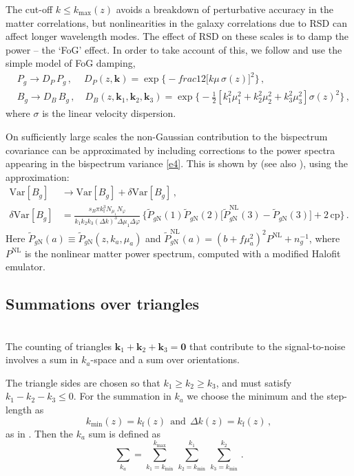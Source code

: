 The  cut-off $k\leq k_{\mathrm{max}}(z)$  avoids a breakdown of perturbative accuracy in the matter correlations, but nonlinearities in the galaxy correlations due to RSD can affect longer wavelength modes. The effect of RSD on these scales is to damp the power -- the  `FoG' effect. In order to take account of this, we follow \cite{Karagiannis:2018jdt,Yankelevich:2018uaz} and use the simple model of FoG damping,
\begin{align}
&P_g \to  D_P\, P_g\,,\quad~ D_{P}(z, \bm{k}) = \exp\Big\{-frac{1}{2}{\big[k\mu\,\sigma(z)\big]^{2}}\Big\}\,, \\
&B_g \to  D_B\, B_g\,,  \quad D_{B}(z, \bm{k}_{1},\bm{k}_{2},\bm{k}_{3}) = \exp\Big\{-\frac{1}{2}{\left[k_{1}^{2}\mu_{1}^{2}+k_{2}^{2}\mu_{2}^{2}+k_{3}^{2}\mu_{3}^{2}\right]\sigma(z)^{2}}\Big\}\,, \label{e13}
\end{align}
where $\sigma$ is the linear velocity dispersion.

On sufficiently large scales the non-Gaussian contribution to the bispectrum covariance can be  approximated by including corrections to the power spectra appearing in the bispectrum variance \eqref{e4}. This is shown by  \cite{Chan:2016ehg}  (see also \cite{Karagiannis:2018jdt}), using  the approximation:
\begin{align}
{\mathrm{Var}} [{B_{g}}] &\to  {\mathrm{Var}} [{B_{g}}]+ \delta {\mathrm{Var}} [{B_{g}}] \,, \\
\delta {\mathrm{Var}} [{B_{g}}] &= \frac{s_B\pi k_{\mathrm{f}}^3N_{\mu_1}N_\varphi}{k_1k_2k_3 (\Delta k)^3\Delta \mu_1 \Delta \varphi}\, \Big\{\tilde{P}_{g{\mathrm{N}}}(1) \tilde{P}_{g{\mathrm{N}}}(2)\Big[ \tilde{P}^{\mathrm{NL}}_{g{\mathrm{N}}}(3)-\tilde{P}_{g{\mathrm{N}}}(3)\Big] +2\, \mbox{cp}\Big\}\,.
\label{e4x}
\end{align}
Here $\tilde{P}_{g{\mathrm{N}}}(a)\equiv \tilde{P}_{g{\mathrm{N}}}(z,k_a,\mu_a)$ and $\tilde{P}^{\mathrm{NL}}_{g{\mathrm{N}}}(a) = (b+f\mu_a^2)^2P^{\mathrm{NL}}+n_g^{-1}$, where $P^{\mathrm{NL}}$ is the nonlinear matter power spectrum, computed with a modified Halofit emulator.
%
\subsection{Summations {over triangles}} 
~\\
The counting of triangles $\bm{k}_{1}+\bm{k}_{2}+\bm{k}_{3}=\bm{0}$ that contribute to the signal-to-noise  involves a sum in $k_a$-space and a sum over orientations.

The triangle sides are chosen so that $k_1\geq k_2 \geq k_3$, and must satisfy $k_1-k_2-k_3\leq 0$.
For the summation in $k_a$ we choose the minimum and  the step-length as
\begin{equation}
k_{\mathrm{min}}(z)=k_{\mathrm{f}}(z)~~\mbox{and}~~ \Delta k(z)=k_{\mathrm{f}}(z) \,,
\end{equation}
as in \cite{Karagiannis:2018jdt,Yankelevich:2018uaz}. 
Then the $k_a$ sum is defined as \cite{Liguori:2010hx,Oddo:2019run}
\begin{equation}
 \sum_{k_a} = \sum_{k_{1}=k_{\mathrm{min}}}^{k_{\mathrm{max}}}\,\sum_{k_{2}=k_{\mathrm{min}}}^{k_{1}}\,\sum_{k_{3}=k_{\mathrm{min}}}^{k_{2}}
\,.\label{e8}
\end{equation} 

